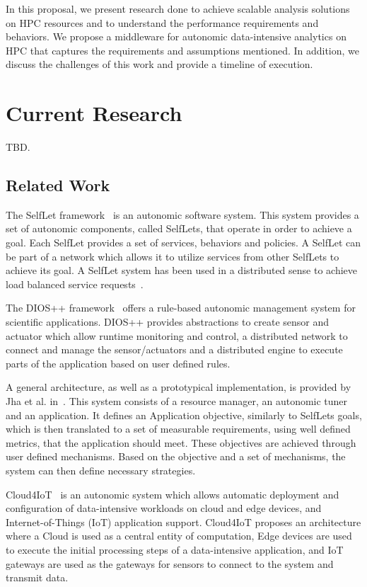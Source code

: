 In this proposal, we present research done to achieve scalable analysis solutions on HPC resources and to understand the performance requirements and behaviors. We propose a middleware for autonomic data-intensive analytics on HPC that captures the requirements and assumptions mentioned. In addition, we discuss the challenges of this work and provide a timeline of execution.

\section{Current Research}

TBD.

\subsection{Related Work}

The SelfLet framework~\cite{bindelli2008building} is an autonomic software system. This system provides a set of autonomic components, called SelfLets, that operate in order to achieve a goal. Each SelfLet provides a set of services, behaviors and policies. A SelfLet can be part of a network which allows it to utilize services from other SelfLets to achieve its goal. A SelfLet system has been used in a distributed sense to achieve load balanced service requests~\cite{calcavecchia2010emergence}.

The DIOS++ framework~\cite{liu2003dios} offers a rule-based autonomic management system for scientific applications. DIOS++ provides abstractions to create sensor and actuator which allow runtime monitoring and control, a distributed network to connect and manage the sensor/actuators and a distributed engine to execute parts of the application based on user defined rules.

A general architecture, as well as a prototypical implementation, is provided by Jha et al. in~\cite{jha2009self}. This system consists of a resource manager, an autonomic tuner and an application. It defines an Application objective, similarly to SelfLets goals, which is then translated to a set of measurable requirements, using well defined metrics, that the application should meet. These objectives are achieved through user defined mechanisms. Based on the objective and a set of mechanisms, the system can then define necessary strategies.

Cloud4IoT~\cite{pizzolli2016cloud4iot} is an autonomic system which allows automatic deployment and configuration of data-intensive workloads on cloud and edge devices, and Internet-of-Things (IoT) application support. Cloud4IoT proposes an architecture where a Cloud is used as a central entity of computation, Edge devices are used to execute the initial processing steps of a data-intensive application, and IoT gateways are used as the gateways for sensors to connect to the system and transmit data.

